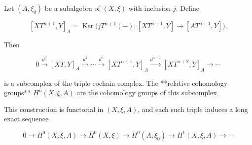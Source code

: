 Let $(A, \xi_0)$ be a subalgebra of $(X, \xi)$ with inclusion $j$. Define

$$[XT^{n+1}, Y]_A = \operatorname{Ker}\big(jT^{n+1}(-): [XT^{n+1}, Y] \rightarrow [AT^{n+1}, Y]\big).$$

Then

$$0 \xrightarrow{d^0} [XT, Y]_A \xrightarrow{d^1} \cdots \xrightarrow{d^n} [XT^{n+1}, Y]_A \xrightarrow{d^{n+1}} [XT^{n+2}, Y]_A \rightarrow \cdots$$

is a subcomplex of the triple cochain complex. The **relative cohomology groups** $H^n(X, \xi, A)$ are the cohomology groups of this subcomplex.

This construction is functorial in $(X, \xi, A)$, and each such triple induces a long exact sequence

$$0 \rightarrow H^0(X, \xi, A) \rightarrow H^0(X, \xi) \rightarrow H^0(A, \xi_0) \rightarrow H^1(X, \xi, A) \rightarrow \cdots$$
